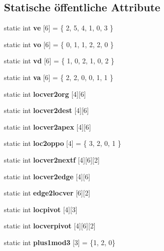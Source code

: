 \subsection*{Statische öffentliche Attribute}
\begin{DoxyCompactItemize}
\item 
\hypertarget{classtetgenmesh_a5197ce8215017cb515a63d4ba0b0fd86}{static int {\bfseries ve} \mbox{[}6\mbox{]} = \{ 2, 5, 4, 1, 0, 3 \}}\label{classtetgenmesh_a5197ce8215017cb515a63d4ba0b0fd86}

\item 
\hypertarget{classtetgenmesh_afa6f80c10883060567ae696d3433d6b5}{static int {\bfseries vo} \mbox{[}6\mbox{]} = \{ 0, 1, 1, 2, 2, 0 \}}\label{classtetgenmesh_afa6f80c10883060567ae696d3433d6b5}

\item 
\hypertarget{classtetgenmesh_ae387f3b3c0cdf52e1e613bb8d2806110}{static int {\bfseries vd} \mbox{[}6\mbox{]} = \{ 1, 0, 2, 1, 0, 2 \}}\label{classtetgenmesh_ae387f3b3c0cdf52e1e613bb8d2806110}

\item 
\hypertarget{classtetgenmesh_a9929adf5b3848744e847eaa70bb8c210}{static int {\bfseries va} \mbox{[}6\mbox{]} = \{ 2, 2, 0, 0, 1, 1 \}}\label{classtetgenmesh_a9929adf5b3848744e847eaa70bb8c210}

\item 
static int {\bfseries locver2org} \mbox{[}4\mbox{]}\mbox{[}6\mbox{]}
\item 
static int {\bfseries locver2dest} \mbox{[}4\mbox{]}\mbox{[}6\mbox{]}
\item 
static int {\bfseries locver2apex} \mbox{[}4\mbox{]}\mbox{[}6\mbox{]}
\item 
\hypertarget{classtetgenmesh_afc4e2b6423bdd956618b72d2e6ac2523}{static int {\bfseries loc2oppo} \mbox{[}4\mbox{]} = \{ 3, 2, 0, 1 \}}\label{classtetgenmesh_afc4e2b6423bdd956618b72d2e6ac2523}

\item 
static int {\bfseries locver2nextf} \mbox{[}4\mbox{]}\mbox{[}6\mbox{]}\mbox{[}2\mbox{]}
\item 
static int {\bfseries locver2edge} \mbox{[}4\mbox{]}\mbox{[}6\mbox{]}
\item 
static int {\bfseries edge2locver} \mbox{[}6\mbox{]}\mbox{[}2\mbox{]}
\item 
static int {\bfseries locpivot} \mbox{[}4\mbox{]}\mbox{[}3\mbox{]}
\item 
static int {\bfseries locverpivot} \mbox{[}4\mbox{]}\mbox{[}6\mbox{]}\mbox{[}2\mbox{]}
\item 
\hypertarget{classtetgenmesh_ae081b8b0b5c051a84e79d1df8c7f0eb9}{static int {\bfseries plus1mod3} \mbox{[}3\mbox{]} = \{1, 2, 0\}}\label{classtetgenmesh_ae081b8b0b5c051a84e79d1df8c7f0eb9}


\end{DoxyCompactItemize}
